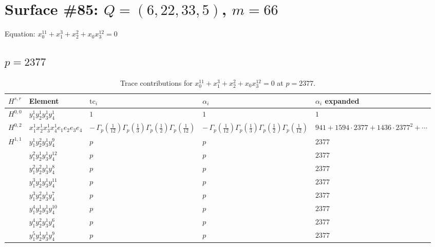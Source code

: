 \documentclass[11pt]{article}
\begin{document}
\newpage

\section*{Surface \#85: $Q=(6, 22, 33, 5)$, $m=66$}

Equation: $x_0^{11} + x_1^{3} + x_2^{2} + x_0 x_3^{12} = 0$

\subsection*{$p = 2377$}

\begin{table}[ht]
\centering
\caption{Trace contributions for $x_0^{11} + x_1^{3} + x_2^{2} + x_0 x_3^{12} = 0$ at $p=2377$.}\label{tab:deformed-85}
\renewcommand{\arraystretch}{1.1}
{\scriptsize
\begin{tabular}{@{}lllll@{}}
\toprule
$H^{s,r}$ & Element & $\mathrm{tc}_i$ & $\alpha_i$ & $\alpha_i$ expanded \\
\midrule
$H^{0,0}$ & $y_{1}^{1} y_{2}^{1} y_{3}^{1} y_{4}^{1}$ & $1$ & $1$ & $1$ \\
\midrule
$H^{0,2}$ & $x_{1}^{1} x_{2}^{1} x_{3}^{1} x_{4}^{1}  e_{1} e_{2} e_{3} e_{4}$ & $- \, \Gamma_p \left( \frac{1}{12} \right) \Gamma_p \left( \frac{1}{3} \right) \Gamma_p \left( \frac{1}{2} \right) \Gamma_p \left( \frac{1}{12} \right)$ & $- \, \Gamma_p \left( \frac{1}{12} \right) \Gamma_p \left( \frac{1}{3} \right) \Gamma_p \left( \frac{1}{2} \right) \Gamma_p \left( \frac{1}{12} \right)$ & $941{+}1594{\cdot}2377{+}1436{\cdot}2377^{2}{+}\cdots$ \\
\midrule
$H^{1,1}$ & $y_{1}^{1} y_{2}^{2} y_{3}^{1} y_{4}^{9}$ & $p \,$ & $p \,$ & $2377$ \\
 & $y_{1}^{2} y_{2}^{1} y_{3}^{1} y_{4}^{12}$ & $p \,$ & $p \,$ & $2377$ \\
 & $y_{1}^{2} y_{2}^{2} y_{3}^{1} y_{4}^{8}$ & $p \,$ & $p \,$ & $2377$ \\
 & $y_{1}^{3} y_{2}^{1} y_{3}^{1} y_{4}^{11}$ & $p \,$ & $p \,$ & $2377$ \\
 & $y_{1}^{3} y_{2}^{2} y_{3}^{1} y_{4}^{7}$ & $p \,$ & $p \,$ & $2377$ \\
 & $y_{1}^{4} y_{2}^{1} y_{3}^{1} y_{4}^{10}$ & $p \,$ & $p \,$ & $2377$ \\
 & $y_{1}^{4} y_{2}^{2} y_{3}^{1} y_{4}^{6}$ & $p \,$ & $p \,$ & $2377$ \\
 & $y_{1}^{5} y_{2}^{1} y_{3}^{1} y_{4}^{9}$ & $p \,$ & $p \,$ & $2377$ \\

\end{tabular}}
\end{table}
\end{document}
